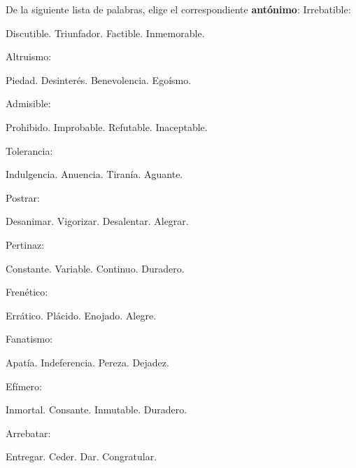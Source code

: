 \documentclass[12pt]{exam}
\begin{document}
\begin{multicols}{2}
\begin{questions}
De la siguiente lista de palabras, elige el correspondiente \textbf{antónimo}:
    \question Irrebatible:
    \begin{choices}
        \choice Discutible.
        \choice Triunfador.
        \choice Factible.
        \choice Inmemorable.
    \end{choices}
    \question Altruismo:
    \begin{choices}
        \choice Piedad.
        \choice Desinterés.
        \choice Benevolencia.
        \choice Egoísmo.
    \end{choices}
    \question Admisible:
    \begin{choices}
        \choice Prohibido.
        \choice Improbable.
        \choice Refutable.
        \choice Inaceptable.
    \end{choices}
    \question Tolerancia:
    \begin{choices}
        \choice Indulgencia.
        \choice Anuencia.
        \choice Tiranía.
        \choice Aguante.
    \end{choices}
    \question Postrar:
    \begin{choices}
        \choice Desanimar.
        \choice Vigorizar.
        \choice Desalentar.
        \choice Alegrar.
    \end{choices}
    \question Pertinaz:
    \begin{choices}
        \choice Constante.
        \choice Variable.
        \choice Continuo.
        \choice Duradero.
    \end{choices}
    \question Frenético:
    \begin{choices}
        \choice Errático.
        \choice Plácido.
        \choice Enojado.
        \choice Alegre.
    \end{choices}
    \question Fanatismo:
    \begin{choices}
        \choice Apatía.
        \choice Indeferencia.
        \choice Pereza.
        \choice Dejadez.
    \end{choices}
    \question Efímero:
    \begin{choices}
        \choice Inmortal.
        \choice Consante.
        \choice Inmutable.
        \choice Duradero.
    \end{choices}
    \question Arrebatar:
    \begin{choices}
        \choice Entregar.
        \choice Ceder.
        \choice Dar.
        \choice Congratular.
    \end{choices}


\end{questions}
\end{multicols}
\end{document}
